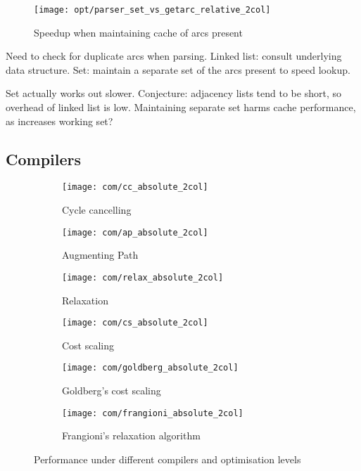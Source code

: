 \begin{figure}
    \centering
    \texttt{[image: opt/parser\_set\_vs\_getarc\_relative\_2col]}
    \caption{Speedup when maintaining cache of arcs present}
    \label{fig:opt-dimacs-parser}
\end{figure}

Need to check for duplicate arcs when parsing. Linked list: consult underlying data structure. Set: maintain a separate set of the arcs present to speed lookup.

Set actually works out slower. Conjecture: adjacency lists tend to be short, so overhead of linked list is low. Maintaining separate set harms cache performance, as increases working set?


\subsection{Compilers}

\begin{figure}
    \begin{widepage}
    \begin{subfigure}[c]{0.5\textwidth}
        \texttt{[image: com/cc\_absolute\_2col]}
        \caption{Cycle cancelling}
    \end{subfigure}
    \begin{subfigure}[c]{0.5\textwidth}
        \texttt{[image: com/ap\_absolute\_2col]}
        \caption{Augmenting Path}
    \end{subfigure}
    \begin{subfigure}[c]{0.5\textwidth}
        \texttt{[image: com/relax\_absolute\_2col]}
        \caption{Relaxation}
    \end{subfigure}
    \begin{subfigure}[c]{0.5\textwidth}
        \texttt{[image: com/cs\_absolute\_2col]}
        \caption{Cost scaling}
    \end{subfigure}
    \begin{subfigure}[c]{0.5\textwidth}
        \texttt{[image: com/goldberg\_absolute\_2col]}
        \caption{Goldberg's cost scaling}
    \end{subfigure}
    \begin{subfigure}[c]{0.5\textwidth}
        \texttt{[image: com/frangioni\_absolute\_2col]}
        \caption{Frangioni's relaxation algorithm}
    \end{subfigure}
    \end{widepage}
    \caption{Performance under different compilers and optimisation levels}
    \label{fig:compilers}
\end{figure}

